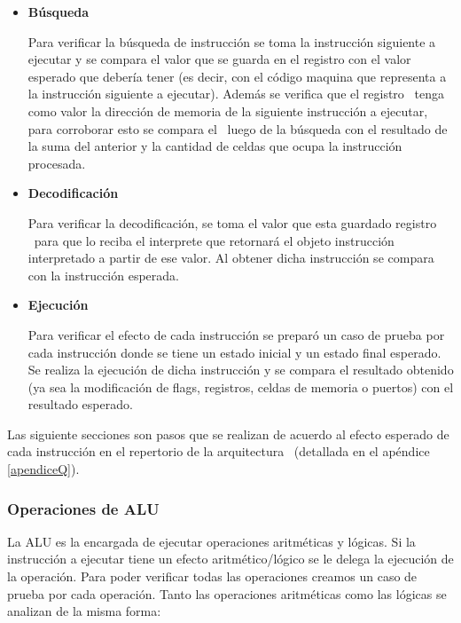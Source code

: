 \begin{itemize}
\item \textbf{Búsqueda} 

Para verificar la búsqueda de instrucción se toma la instrucción siguiente a ejecutar y se compara el valor que se guarda en el registro \IR con el valor esperado que debería tener (es decir, con el código maquina que representa a la instrucción siguiente a ejecutar). Además se verifica que el registro \PC\ tenga como valor la dirección de memoria de la siguiente instrucción a ejecutar, para corroborar esto se compara el \PC\ luego de la búsqueda con el resultado de la suma del \PC anterior y la cantidad de celdas que ocupa la instrucción procesada.

\item \textbf{Decodificación}

Para verificar la decodificación, se toma el valor que esta guardado registro \IR\ para que lo reciba el interprete que retornará el objeto instrucción interpretado a partir de ese valor. Al obtener dicha instrucción se compara con la instrucción esperada.
 
\item \textbf{Ejecución}

Para verificar el efecto de cada instrucción se preparó un caso de prueba por cada instrucción donde se tiene un estado inicial y un estado final esperado. Se realiza la ejecución de dicha instrucción y se compara el resultado obtenido (ya sea la modificación de flags, registros, celdas de memoria o puertos) con el resultado esperado. 

\end{itemize}

Las siguiente secciones son pasos que se realizan de acuerdo al efecto esperado de cada instrucción en el repertorio de la arquitectura \Q\ (detallada en el apéndice \ref{apendiceQ}).
  
\subsubsection{Operaciones de ALU}

La ALU es la encargada de ejecutar operaciones aritméticas y lógicas. Si la instrucción a ejecutar tiene un efecto aritmético/lógico se le delega la ejecución de la operación. Para poder verificar todas las operaciones creamos un caso de prueba por cada operación. Tanto las operaciones aritméticas como las lógicas se analizan de la misma forma:

